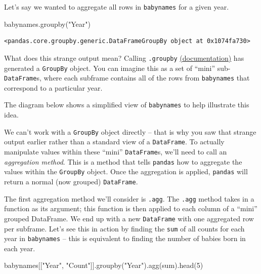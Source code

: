 \documentclass[
  letterpaper,
  DIV=11,
  numbers=noendperiod]{scrreprt}
\newenvironment{Shaded}{\begin{snugshade}}{\end{snugshade}}
\newcommand{\BuiltInTok}[1]{\textcolor[rgb]{0.00,0.23,0.31}{#1}}
\newcommand{\DecValTok}[1]{\textcolor[rgb]{0.68,0.00,0.00}{#1}}
\newcommand{\NormalTok}[1]{\textcolor[rgb]{0.00,0.23,0.31}{#1}}
\newcommand{\StringTok}[1]{\textcolor[rgb]{0.13,0.47,0.30}{#1}}
\begin{document}
Let's say we wanted to aggregate all rows in \texttt{babynames} for a
given year.

\begin{Shaded}
\begin{Highlighting}[]
\NormalTok{babynames.groupby(}\StringTok{"Year"}\NormalTok{)}
\end{Highlighting}
\end{Shaded}

\begin{verbatim}
<pandas.core.groupby.generic.DataFrameGroupBy object at 0x1074fa730>
\end{verbatim}

What does this strange output mean? Calling \texttt{.groupby}
\href{https://pandas.pydata.org/pandas-docs/stable/reference/api/pandas.DataFrame.groupby.html}{(documentation)}
has generated a \texttt{GroupBy} object. You can imagine this as a set
of ``mini'' sub-\texttt{DataFrame}s, where each subframe contains all of
the rows from \texttt{babynames} that correspond to a particular year.

The diagram below shows a simplified view of \texttt{babynames} to help
illustrate this idea.

We can't work with a \texttt{GroupBy} object directly -- that is why you
saw that strange output earlier rather than a standard view of a
\texttt{DataFrame}. To actually manipulate values within these ``mini''
\texttt{DataFrame}s, we'll need to call an \emph{aggregation method}.
This is a method that tells \texttt{pandas} how to aggregate the values
within the \texttt{GroupBy} object. Once the aggregation is applied,
\texttt{pandas} will return a normal (now grouped) \texttt{DataFrame}.

The first aggregation method we'll consider is \texttt{.agg}. The
\texttt{.agg} method takes in a function as its argument; this function
is then applied to each column of a ``mini'' grouped DataFrame. We end
up with a new \texttt{DataFrame} with one aggregated row per subframe.
Let's see this in action by finding the \texttt{sum} of all counts for
each year in \texttt{babynames} -- this is equivalent to finding the
number of babies born in each year.

\begin{Shaded}
\begin{Highlighting}[]
\NormalTok{babynames[[}\StringTok{"Year"}\NormalTok{, }\StringTok{"Count"}\NormalTok{]].groupby(}\StringTok{"Year"}\NormalTok{).agg(}\BuiltInTok{sum}\NormalTok{).head(}\DecValTok{5}\NormalTok{)}
\end{Highlighting}
\end{Shaded}
\end{document}
